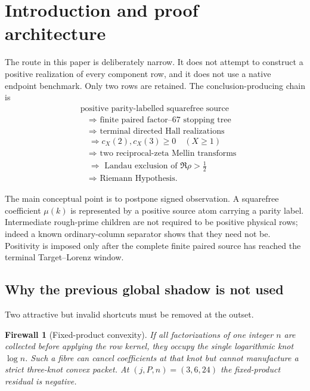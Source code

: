 \documentclass[11pt]{article}
\newtheorem{warning}[theorem]{Firewall}
\begin{document}
\tableofcontents

\section{Introduction and proof architecture}

The route in this paper is deliberately narrow.  It does not attempt to construct a positive realization of every component row, and it does not use a native endpoint benchmark.  Only two rows are retained.  The conclusion-producing chain is
\begin{equation*}
\begin{split}
&\text{positive parity-labelled squarefree source}\\
&\quad\Longrightarrow\text{ finite paired factor--67 stopping tree}\\
&\quad\Longrightarrow\text{ terminal directed Hall realizations}\\
&\quad\Longrightarrow c_X(2),c_X(3)\ge0\quad(X\ge1)\\
&\quad\Longrightarrow\text{ two reciprocal-zeta Mellin transforms}\\
&\quad\Longrightarrow\text{ Landau exclusion of }\Re\rho>\tfrac12\\
&\quad\Longrightarrow\text{ Riemann Hypothesis.}
\end{split}
\end{equation*}

The main conceptual point is to postpone signed observation.  A squarefree coefficient $\mu(k)$ is represented by a positive source atom carrying a parity label.  Intermediate rough-prime children are not required to be positive physical rows; indeed a known ordinary-column separator shows that they need not be.  Positivity is imposed only after the complete finite paired source has reached the terminal Target--Lorenz window.

\subsection{Why the previous global shadow is not used}

Two attractive but invalid shortcuts must be removed at the outset.

\begin{warning}[Fixed-product convexity]
If all factorizations of one integer $n$ are collected before applying the row kernel, they occupy the single logarithmic knot $\log n$.  Such a fibre can cancel coefficients at that knot but cannot manufacture a strict three-knot convex packet.  At $(j,P,n)=(3,6,24)$ the fixed-product residual is negative.
\end{warning}
\end{document}
